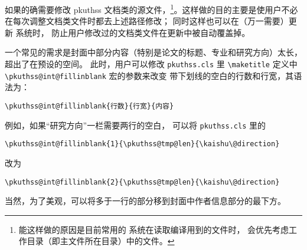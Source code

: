 如果的确需要修改 pkuthss 文档类的源文件，\footnote{%
	能这样做的原因是目前常用的  系统在读取编译用到的文件时，
	会优先考虑工作目录（即主文件所在目录）中的文件。%
}。这样做的目的主要是使用户不必在每次调整文档类文件时都去上述路径修改；
同时这样也可以在（万一需要）更新  系统时，
防止用户修改过的文档类文件在更新中被自动覆盖掉。

一个常见的需求是封面中部分内容（特别是论文的标题、专业和研究方向）太长，
超出了在预设的空间。
此时，用户可以修改 \verb|pkuthss.cls| 里 \verb|\maketitle| 定义中
\verb|\pkuthss@int@fillinblank| 宏的参数来改变
带下划线的空白的行数和行宽，其语法为：
\begin{Verbatim}[frame = single]
\pkuthss@int@fillinblank{行数}{行宽}{内容}
\end{Verbatim}
例如，如果“研究方向”一栏需要两行的空白，
可以将 \verb|pkuthss.cls| 里的
\begin{Verbatim}[frame = single]
\pkuthss@int@fillinblank{1}{\pkuthss@tmp@len}{\kaishu\@direction}
\end{Verbatim}
改为
\begin{Verbatim}[frame = single]
\pkuthss@int@fillinblank{2}{\pkuthss@tmp@len}{\kaishu\@direction}
\end{Verbatim}
当然，为了美观，可以将多于一行的部分移到封面中作者信息部分的最下方。

